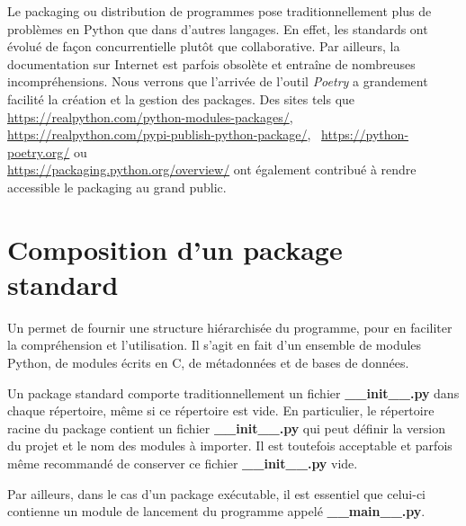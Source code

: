 \documentclass[twoside,a4paper,11pt,frenchb,openany]{report}
\begin{document}
Le packaging ou distribution de programmes pose traditionnellement plus de problèmes en Python que dans d'autres langages. En effet, les standards ont évolué de façon concurrentielle plutôt que collaborative. Par ailleurs, la documentation sur Internet est parfois obsolète et entraîne de nombreuses incompréhensions. Nous verrons que l'arrivée de l'outil \textit{Poetry} a grandement facilité la création et la gestion des packages. Des sites tels que \url{https://realpython.com/python-modules-packages/}, \url{https://realpython.com/pypi-publish-python-package/}, ~\url{https://python-poetry.org/} ou \\ \url{https://packaging.python.org/overview/} ont également contribué à rendre accessible le packaging au grand public.





\section{Composition d'un package standard}

Un  permet de fournir une structure hiérarchisée du programme, pour en faciliter la compréhension et l'utilisation. Il s'agit en fait d'un ensemble de modules Python, de modules écrits en C, de métadonnées et de bases de données.

Un package standard comporte traditionnellement un fichier \textbf{\_\_init\_\_.py} dans chaque répertoire, même si ce répertoire est vide. En particulier, le répertoire racine du package contient un fichier \textbf{\_\_init\_\_.py} qui peut définir la version du projet et le nom des modules à importer. Il est toutefois acceptable et parfois même recommandé de conserver ce fichier \textbf{\_\_init\_\_.py} vide.

Par ailleurs, dans le cas d'un package exécutable, il est essentiel que celui-ci contienne un module de lancement du programme appelé  \textbf{\_\_main\_\_.py}.
\end{document}
